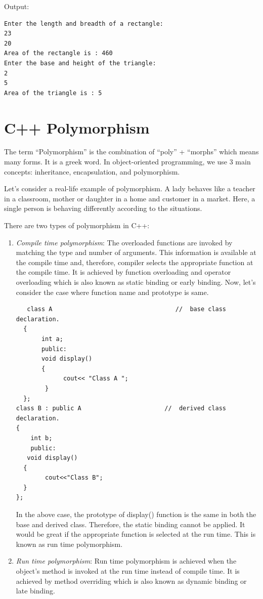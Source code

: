 \documentclass{book}
\begin{document}
Output:

\begin{verbatim}
Enter the length and breadth of a rectangle:
23  
20  
Area of the rectangle is : 460          
Enter the base and height of the triangle:  
2   
5
Area of the triangle is : 5 

\end{verbatim}

\section{C++ Polymorphism}

The term \enquote{Polymorphism} is the combination of \enquote{poly} + \enquote{morphs} which means many forms. It is a greek word. In object-oriented programming, we use 3 main concepts: inheritance, encapsulation, and polymorphism.

Let's consider a real-life example of polymorphism. A lady behaves like a teacher in a classroom, mother or daughter in a home and customer in a market. Here, a single person is behaving differently according to the situations.

There are two types of polymorphism in C++:

\begin{enumerate}
	\item \textit{Compile time polymorphism}: The overloaded functions are invoked by matching the type and number of arguments. This information is available at the compile time and, therefore, compiler selects the appropriate function at the compile time. It is achieved by function overloading and operator overloading which is also known as static binding or early binding. Now, let's consider the case where function name and prototype is same.

\begin{lstlisting}
   class A                                  //  base class declaration.  
  {  
       int a;  
       public:  
       void display()  
       {   
             cout<< "Class A ";  
        }  
  };  
class B : public A                       //  derived class declaration.  
{  
    int b;  
    public:  
   void display()  
  {  
        cout<<"Class B";  
  }  
};  
\end{lstlisting}

In the above case, the prototype of display() function is the same in both the base and derived class. Therefore, the static binding cannot be applied. It would be great if the appropriate function is selected at the run time. This is known as run time polymorphism.

\item \textit{Run time polymorphism}: Run time polymorphism is achieved when the object's method is invoked at the run time instead of compile time. It is achieved by method overriding which is also known as dynamic binding or late binding.

\end{enumerate}
\end{document}
